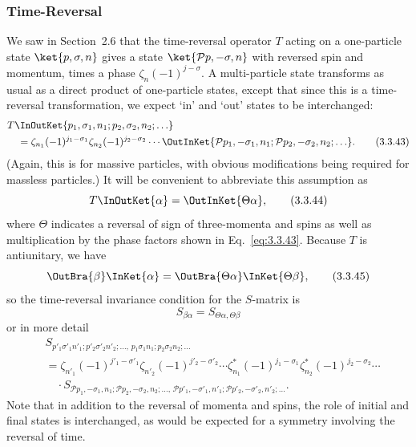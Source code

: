 \subsubsection*{Time-Reversal}

We saw in Section~2.6 that the time-reversal operator $T$ acting on a
one-particle state $\ket{p,\sigma,n}$ gives a state
$\ket{\mathcal{P}p,-\sigma,n}$ with reversed spin and momentum, times a phase
$\zeta_n(-1)^{j-\sigma}$. A multi-particle state transforms as usual as a direct
product of one-particle states, except that since this is a time-reversal
transformation, we expect `in' and `out' states to be interchanged:
\begin{align}
&T\InOutKet{p_1,\sigma_1,n_1;p_2,\sigma_2,n_2;\ldots}
\nonumber\\
&\quad=\zeta_{n_1}(-1)^{j_1-\sigma_1}
\zeta_{n_2}(-1)^{j_2-\sigma_2}\cdots
\OutInKet{\mathcal{P}p_1,-\sigma_1,n_1;
\mathcal{P}p_2,-\sigma_2,n_2;\ldots}.
\tag{3.3.43}\label{eq:3.3.43}
\end{align}
(Again, this is for massive particles, with obvious modifications being required
for massless particles.) It will be convenient to abbreviate this assumption as
\begin{equation}
T\InOutKet{\alpha}=\OutInKet{\Theta\alpha},
\tag{3.3.44}\label{eq:3.3.44}
\end{equation}
where $\Theta$ indicates a reversal of sign of three-momenta and spins as well as
multiplication by the phase factors shown in Eq.~\eqref{eq:3.3.43}. Because $T$ is
antiunitary, we have
\begin{equation}
\OutBra{\beta}\InKet{\alpha}
=\OutBra{\Theta\alpha}\InKet{\Theta\beta},
\tag{3.3.45}\label{eq:3.3.45}
\end{equation}
so the time-reversal invariance condition for the $S$-matrix is
\begin{equation}
S_{\beta\alpha}=S_{\Theta\alpha,\Theta\beta}
\tag{3.3.46}\label{eq:3.3.46}
\end{equation}
or in more detail
\begin{align}
&S_{p'_1\sigma'_1n'_1;p'_2\sigma'_2n'_2;\ldots,\,
p_1\sigma_1n_1;p_2\sigma_2n_2;\ldots}
\nonumber\\
&=\zeta_{n'_1}(-1)^{j'_1-\sigma'_1}
\zeta_{n'_2}(-1)^{j'_2-\sigma'_2}\cdots
\zeta^*_{n_1}(-1)^{j_1-\sigma_1}
\zeta^*_{n_2}(-1)^{j_2-\sigma_2}\cdots
\nonumber\\
&\quad\cdot
S_{\mathcal{P}p_1,-\sigma_1,n_1;\mathcal{P}p_2,-\sigma_2,n_2;\ldots,\,
\mathcal{P}p'_1,-\sigma'_1,n'_1;\mathcal{P}p'_2,-\sigma'_2,n'_2;\ldots}.
\tag{3.3.47}\label{eq:3.3.47}
\end{align}
Note that in addition to the reversal of momenta and spins, the role of initial and
final states is interchanged, as would be expected for a symmetry involving the
reversal of time.

